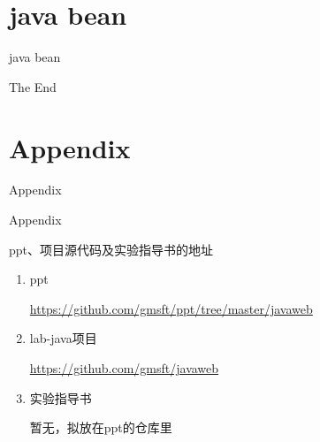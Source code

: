 \documentclass{beamer}
\begin{document}
\section{java bean}
\begin{frame}
\Huge{\centerline{java bean}}
\end{frame}



\begin{frame}
\Huge{\centerline{The End}}
\end{frame}

\section{Appendix}

\begin{frame}
\Huge{\centerline{Appendix}}
\end{frame}
\begin{frame}{Appendix}
\begin{block}{ppt、项目源代码及实验指导书的地址}
\begin{enumerate}
\item
ppt

\url{https://github.com/gmsft/ppt/tree/master/javaweb}
\item
lab-java项目

\url{https://github.com/gmsft/javaweb}

\item
实验指导书

暂无，拟放在ppt的仓库里
\end{enumerate}
\end{block}
\end{frame}

\end{document}
